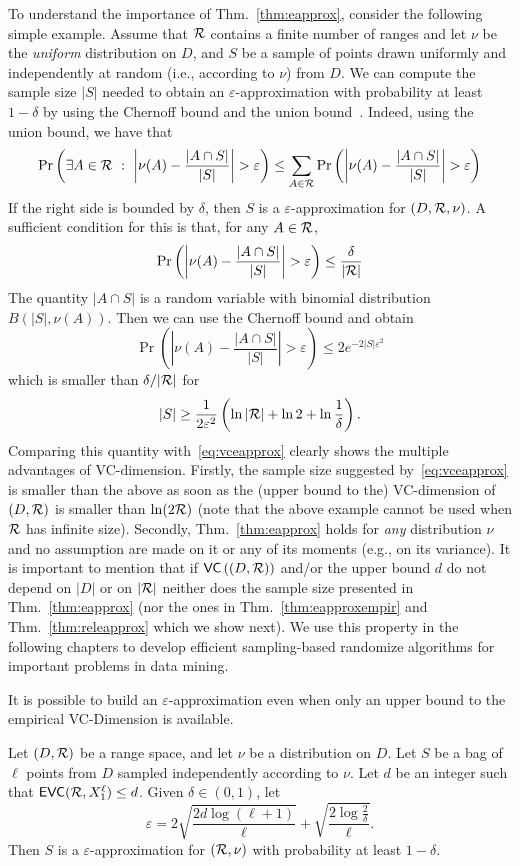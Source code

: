 To understand the importance of Thm.~\ref{thm:eapprox}, consider the following
simple example. Assume that $\mathcal{R}$ contains a finite number of ranges and let
$\nu$ be the \emph{uniform} distribution on $D$, and $S$ be a sample of
points drawn uniformly and independently at random (i.e., according to $\nu$)
from $D$. We can compute the sample size $|S|$ needed to obtain an
$\varepsilon$-approximation with probability at least $1-\delta$ by using the
Chernoff bound and the union
bound~\citep{MitzenmacherU05}. Indeed, using the union bound, we have that
\[
\Pr\left(\exists A\in\range ~:~ \left|\nu(A)-\frac{|A\cap
S|}{|S|}\right|>\varepsilon \right) \le \sum_{A\in\range}\Pr\left(\left|\nu(A)-\frac{|A\cap
S|}{|S|}\right|>\varepsilon\right)\]
If the right side is bounded by $\delta$, then $S$ is a
$\varepsilon$-approximation for $(D,\mathcal{R},\nu)$. A sufficient condition for
this is that, for any $A\in\mathcal{R}$,
\[
\Pr\left(\left|\nu(A)-\frac{|A\cap S|}{|S|}\right|>\varepsilon\right)\le
\frac{\delta}{|\range|}
\]
The quantity
$|A\cap S|$ is a random variable with binomial distribution $B(|S|, \nu(A))$.
Then we can use the Chernoff bound and obtain
\[
\Pr\left(\left|\nu(A)-\frac{|A\cap S|}{|S|}\right|>\varepsilon\right)\le 2e^{-2|S|\varepsilon^2}
\]
which is smaller than $\delta/|\mathcal{R}|$ for
\[
|S|\ge\frac{1}{2\varepsilon^2}\left(\ln|\mathcal{R}|+\ln 2 +\ln\frac{1}{\delta}\right).
\]
Comparing this quantity with~\eqref{eq:vceapprox} clearly shows the multiple
advantages of VC-dimension. Firstly, the sample size suggested
by~\eqref{eq:vceapprox} is smaller than the above as soon as the (upper bound to
the) VC-dimension of $(D,\mathcal{R})$ is smaller than $\ln(2\mathcal{R})$ (note that the
above example cannot be used when $\mathcal{R}$ has infinite size). Secondly,
Thm.~\ref{thm:eapprox} holds for \emph{any} distribution $\nu$ and no assumption
are made on it or any of its moments (e.g., on its variance). 
It is important to mention that if $\mathsf{VC}\left((D,\mathcal{R})\right)$ and/or the upper
bound $d$ do not depend on $|D|$ or on $|\mathcal{R}|$ neither does the sample size
presented in Thm.~\ref{thm:eapprox} (nor the ones in Thm.~\ref{thm:eapproxempir}
and Thm.~\ref{thm:releapprox} which we show next). We use this property in the
following chapters to develop efficient sampling-based randomize algorithms for
important problems in data mining.

It is possible to build an $\varepsilon$-approximation even when only an upper
bound to the empirical VC-Dimension is available.
\begin{theorem}\label{thm:eapproxempir}
  Let $(D,\mathcal{R})$ be a range space, and let $\nu$ be a distribution on $D$. Let
  $S$ be a bag of $\ell$ points from $D$ sampled independently according
  to $\nu$. Let $d$ be an integer such that $\mathsf{EVC}(\mathcal{R},X_1^\ell)\le d$.
  Given $\delta\in(0,1)$, let 
  \begin{equation}\label{eq:evceapprox}
    \varepsilon =
    2\sqrt{\frac{2d\log(\ell+1)}{\ell}}+\sqrt{\frac{2\log\frac{2}{\delta}}{\ell}}.
  \end{equation}
   Then $S$ is a $\varepsilon$-approximation for $(\mathcal{R},\nu)$
   with probability at least $1-\delta$.
 \end{theorem}

